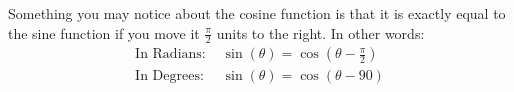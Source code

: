 Something you may notice about the cosine function is that it is exactly equal to the sine function if you move it $\frac{\pi}{2}$ units to the right. In other words:
\begin{align*}
    \text{In Radians: } &\sin(\theta) = \cos\left(\theta - \frac{\pi}{2} \right) \\
    \text{In Degrees: } &\sin(\theta) = \cos\left(\theta - 90\right)
\end{align*}